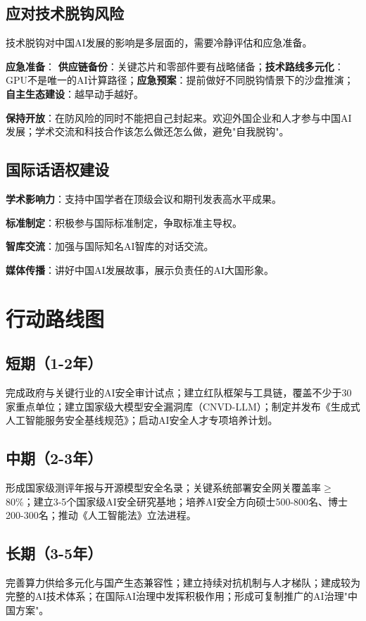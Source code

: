 \subsection{应对技术脱钩风险}

技术脱钩对中国AI发展的影响是多层面的，需要冷静评估和应急准备。

\textbf{应急准备}：
\textbf{供应链备份}：关键芯片和零部件要有战略储备；\textbf{技术路线多元化}：GPU不是唯一的AI计算路径；\textbf{应急预案}：提前做好不同脱钩情景下的沙盘推演；\textbf{自主生态建设}：越早动手越好。

\textbf{保持开放}：在防风险的同时不能把自己封起来。欢迎外国企业和人才参与中国AI发展；学术交流和科技合作该怎么做还怎么做，避免"自我脱钩"。

\subsection{国际话语权建设}

\textbf{学术影响力}：支持中国学者在顶级会议和期刊发表高水平成果。

\textbf{标准制定}：积极参与国际标准制定，争取标准主导权。

\textbf{智库交流}：加强与国际知名AI智库的对话交流。

\textbf{媒体传播}：讲好中国AI发展故事，展示负责任的AI大国形象。

\section{行动路线图}

\subsection{短期（1-2年）}
完成政府与关键行业的AI安全审计试点；建立红队框架与工具链，覆盖不少于30家重点单位；建立国家级大模型安全漏洞库（CNVD-LLM）；制定并发布《生成式人工智能服务安全基线规范》；启动AI安全人才专项培养计划。

\subsection{中期（2-3年）}
形成国家级测评年报与开源模型安全名录；关键系统部署安全网关覆盖率$\geq$80\%；建立3-5个国家级AI安全研究基地；培养AI安全方向硕士500-800名、博士200-300名；推动《人工智能法》立法进程。

\subsection{长期（3-5年）}
完善算力供给多元化与国产生态兼容性；建立持续对抗机制与人才梯队；建成较为完整的AI技术体系；在国际AI治理中发挥积极作用；形成可复制推广的AI治理"中国方案"。

